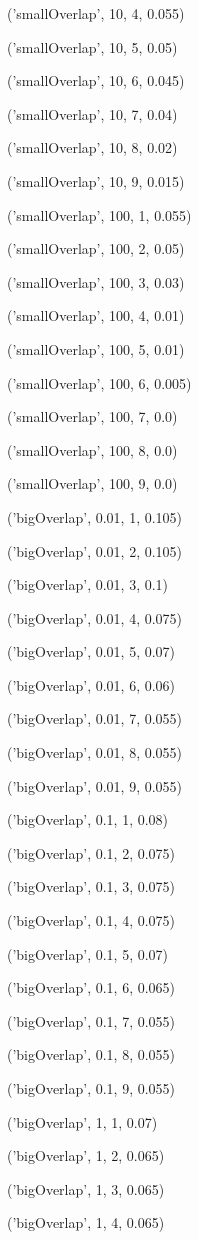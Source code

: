 \documentclass{paper}
\begin{document}
\begin{enumerate}
('smallOverlap', 10, 4, 0.055)

('smallOverlap', 10, 5, 0.05)

('smallOverlap', 10, 6, 0.045)

('smallOverlap', 10, 7, 0.04)

('smallOverlap', 10, 8, 0.02)

('smallOverlap', 10, 9, 0.015)

('smallOverlap', 100, 1, 0.055)

('smallOverlap', 100, 2, 0.05)

('smallOverlap', 100, 3, 0.03)

('smallOverlap', 100, 4, 0.01)

('smallOverlap', 100, 5, 0.01)

('smallOverlap', 100, 6, 0.005)

('smallOverlap', 100, 7, 0.0)

('smallOverlap', 100, 8, 0.0)

('smallOverlap', 100, 9, 0.0)

('bigOverlap', 0.01, 1, 0.105)

('bigOverlap', 0.01, 2, 0.105)

('bigOverlap', 0.01, 3, 0.1)

('bigOverlap', 0.01, 4, 0.075)

('bigOverlap', 0.01, 5, 0.07)

('bigOverlap', 0.01, 6, 0.06)

('bigOverlap', 0.01, 7, 0.055)

('bigOverlap', 0.01, 8, 0.055)

('bigOverlap', 0.01, 9, 0.055)

('bigOverlap', 0.1, 1, 0.08)

('bigOverlap', 0.1, 2, 0.075)

('bigOverlap', 0.1, 3, 0.075)

('bigOverlap', 0.1, 4, 0.075)

('bigOverlap', 0.1, 5, 0.07)

('bigOverlap', 0.1, 6, 0.065)

('bigOverlap', 0.1, 7, 0.055)

('bigOverlap', 0.1, 8, 0.055)

('bigOverlap', 0.1, 9, 0.055)

('bigOverlap', 1, 1, 0.07)

('bigOverlap', 1, 2, 0.065)

('bigOverlap', 1, 3, 0.065)

('bigOverlap', 1, 4, 0.065)


\end{enumerate}
\end{document}
